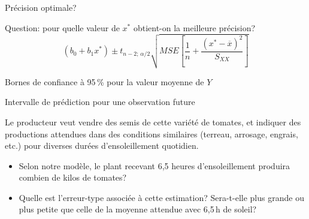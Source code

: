 \documentclass{BeamerTemplate}
\def\bzero{1.37242}
\def\bun{0.43126}
\def\mse{0.32278}
\def\tq{2.0017}
\begin{document}
\begin{frame}[t]{Précision optimale?}

\alert{Question:} pour quelle valeur de $x^*$ obtient-on la meilleure précision?
\[
(b_0+b_1x^*)\pm t_{n-2;\,\alpha/2}\sqrt{MSE\left[\frac1n
+\frac{(x^*-\overline{x})^2}{S_{XX}}\right]}
\]

\vspace{3cm}

\end{frame}

\begin{frame}[t]{Bornes de confiance à 95\,\% pour la valeur moyenne de $Y$}

\begin{center}
\end{center}

\end{frame}

\begin{frame}[t]{Intervalle de prédiction pour une observation future}

Le producteur veut vendre des semis de cette variété de tomates, et indiquer des
productions attendues dans des conditions similaires (terreau, arrosage,
engrais, etc.) pour diverses durées d'ensoleillement quotidien.

\bigskip
\begin{itemize}\itemsep3mm
  \item Selon notre modèle, \alert{le} plant recevant 6,5 heures d'ensoleillement
  produira combien de kilos de tomates?
  \item Quelle est l'erreur-type associée à cette estimation? Sera-t-elle plus
  grande ou plus petite que celle de la moyenne attendue avec 6,5\,h de soleil?
\end{itemize}

\end{frame}
\end{document}
